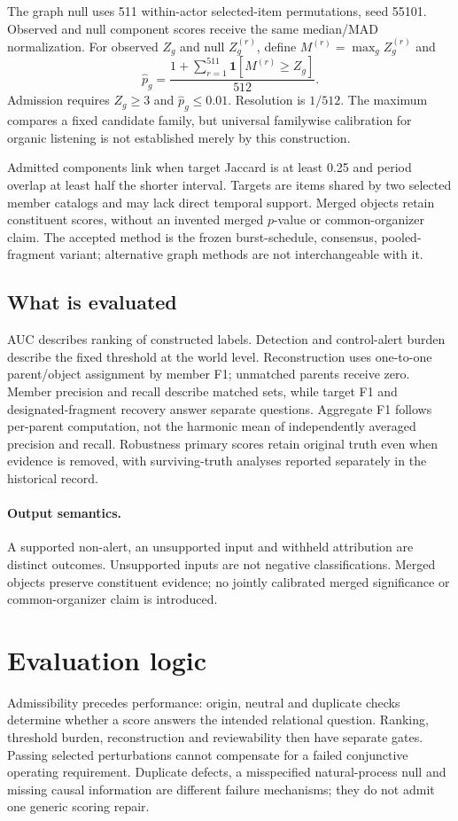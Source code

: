 \documentclass[sigconf,nonacm]{acmart}
\begin{document}
The graph null uses 511 within-actor selected-item permutations, seed 55101. Observed and null component scores receive the same median/MAD normalization. For observed $Z_g$ and null $Z_g^{(r)}$, define $M^{(r)}=\max_g Z_g^{(r)}$ and
\begin{equation}
\widehat p_g=\frac{1+\sum_{r=1}^{511}\mathbf1[M^{(r)}\geq Z_g]}{512}.
\end{equation}
Admission requires $Z_g\geq3$ and $\widehat p_g\leq0.01$. Resolution is $1/512$. The maximum compares a fixed candidate family, but universal familywise calibration for organic listening is not established merely by this construction.

Admitted components link when target Jaccard is at least 0.25 and period overlap at least half the shorter interval. Targets are items shared by two selected member catalogs and may lack direct temporal support. Merged objects retain constituent scores, without an invented merged $p$-value or common-organizer claim. The accepted method is the frozen burst-schedule, consensus, pooled-fragment variant; alternative graph methods are not interchangeable with it.

\subsection{What is evaluated}
AUC describes ranking of constructed labels. Detection and control-alert burden describe the fixed threshold at the world level. Reconstruction uses one-to-one parent/object assignment by member F1; unmatched parents receive zero. Member precision and recall describe matched sets, while target F1 and designated-fragment recovery answer separate questions. Aggregate F1 follows per-parent computation, not the harmonic mean of independently averaged precision and recall. Robustness primary scores retain original truth even when evidence is removed, with surviving-truth analyses reported separately in the historical record.

\paragraph{Output semantics.} A supported non-alert, an unsupported input and withheld attribution are distinct outcomes. Unsupported inputs are not negative classifications. Merged objects preserve constituent evidence; no jointly calibrated merged significance or common-organizer claim is introduced.

\section{Evaluation logic}
Admissibility precedes performance: origin, neutral and duplicate checks determine whether a score answers the intended relational question. Ranking, threshold burden, reconstruction and reviewability then have separate gates. Passing selected perturbations cannot compensate for a failed conjunctive operating requirement. Duplicate defects, a misspecified natural-process null and missing causal information are different failure mechanisms; they do not admit one generic scoring repair.
\end{document}

